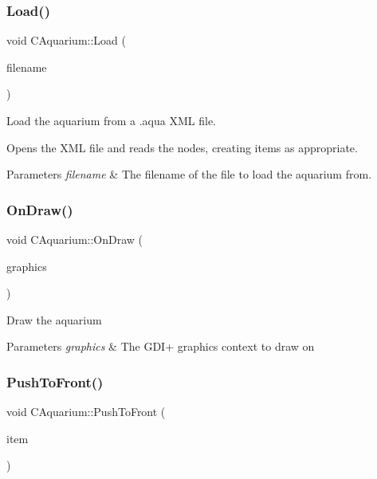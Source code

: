 \subsubsection{\texorpdfstring{Load()}{Load()}}
{\footnotesize\ttfamily void C\+Aquarium\+::\+Load (\begin{DoxyParamCaption}\item[{const std\+::wstring \&}]{filename }\end{DoxyParamCaption})}

Load the aquarium from a .aqua X\+ML file.

Opens the X\+ML file and reads the nodes, creating items as appropriate.


\begin{DoxyParams}{Parameters}
{\em filename} & The filename of the file to load the aquarium from. \\
\hline
\end{DoxyParams}
\mbox{\label{class_c_aquarium_a20b4899158d1ba4bc41217630d47e180}} 
\subsubsection{\texorpdfstring{On\+Draw()}{OnDraw()}}
{\footnotesize\ttfamily void C\+Aquarium\+::\+On\+Draw (\begin{DoxyParamCaption}\item[{Gdiplus\+::\+Graphics $\ast$}]{graphics }\end{DoxyParamCaption})}

Draw the aquarium 
\begin{DoxyParams}{Parameters}
{\em graphics} & The G\+D\+I+ graphics context to draw on \\
\hline
\end{DoxyParams}
\mbox{\label{class_c_aquarium_a2ee2a7d57d9f5d9996f9f9b468c98a2b}} 
\subsubsection{\texorpdfstring{Push\+To\+Front()}{PushToFront()}}
{\footnotesize\ttfamily void C\+Aquarium\+::\+Push\+To\+Front (\begin{DoxyParamCaption}\item[{std\+::shared\+\_\+ptr$<$ \mbox{\hyperlink{class_c_item}{C\+Item}} $>$}]{item }\end{DoxyParamCaption})}

